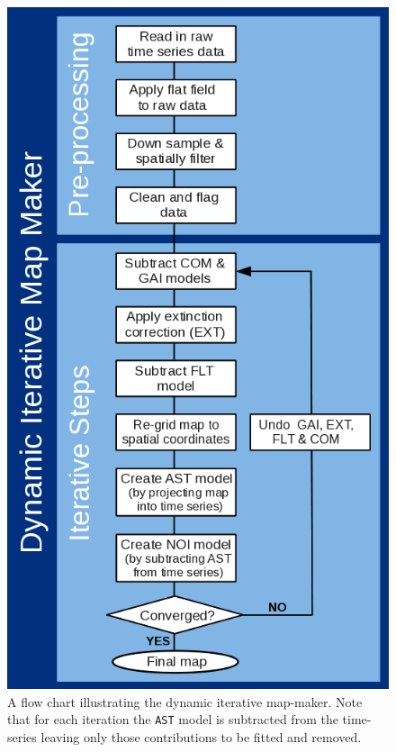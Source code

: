 \documentclass[twoside,11pt]{article}
\newenvironment{latexonly}{}{}
\renewcommand{\_}{\texttt{\symbol{95}}}
\begin{document}
\begin{latexonly}
\begin{figure}
\centering\includegraphics[width=0.78\linewidth]{sc21_flow_dimm_blue}
\caption{\label{fig:dimm}\small A flow chart illustrating the dynamic
iterative map-maker. Note that for each iteration the \texttt{AST}
model is subtracted from the time-series leaving only those
contributions to be fitted and removed.}
\end{figure}
\end{latexonly}
\end{document}
